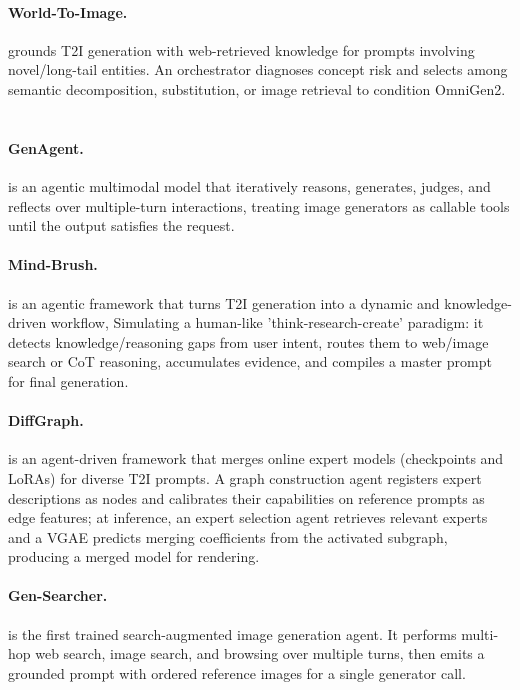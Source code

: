 \paragraph{World-To-Image.}
 grounds T2I generation with web-retrieved knowledge for prompts involving novel/long-tail entities. An orchestrator diagnoses concept risk and selects among semantic decomposition, substitution, or image retrieval to condition OmniGen2. ~\cite{avg251004201}

\paragraph{GenAgent.}
 is an agentic multimodal model that iteratively reasons, generates, judges, and reflects over multiple-turn interactions, treating image generators as callable tools until the output satisfies the request. ~\cite{jiang2026genagent}

\paragraph{Mind-Brush.}
 is an agentic framework that turns T2I generation into a dynamic and knowledge-driven workflow, Simulating a human-like ’think-research-create’ paradigm: it detects knowledge/reasoning gaps from user intent, routes them to web/image search or CoT reasoning, accumulates evidence, and compiles a master prompt for final generation. ~\cite{avg260201756}

\paragraph{DiffGraph.}
 is an agent-driven framework that merges online expert models (checkpoints and LoRAs) for diverse T2I prompts. A graph construction agent registers expert descriptions as nodes and calibrates their capabilities on reference prompts as edge features; at inference, an expert selection agent retrieves relevant experts and a VGAE predicts merging coefficients from the activated subgraph, producing a merged model for rendering.~\cite{avg260320470}

\paragraph{Gen-Searcher.}
 is the first trained search-augmented image
generation agent. It performs multi-hop web search, image search, and browsing over multiple turns, then emits a grounded prompt with ordered reference images for a single generator call. ~\cite{avg260328767}

